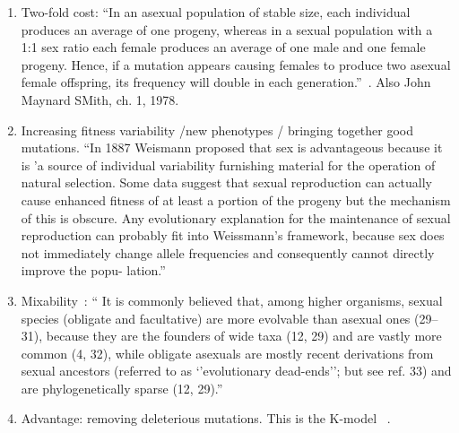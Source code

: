 \begin{enumerate}
    \item Two-fold cost: ``In an asexual population of stable size, each individual produces an average of one progeny, whereas in a  sexual population with a 1:1 sex ratio each female produces an average of one male and one female progeny. Hence, if a mutation appears causing females to produce two asexual female offspring, its frequency will double in each generation.''~\cite{kondrashov_deleterious_1988}. Also John Maynard SMith, ch. 1, 1978.

    \item Increasing fitness variability /new phenotypes / bringing together good mutations. ``In 1887 Weismann proposed that sex is advantageous because it is 'a source of individual variability furnishing material for  the operation of natural selection. Some data suggest that sexual reproduction can actually cause enhanced fitness of at least a portion of the progeny but the mechanism of this is obscure. Any evolutionary explanation for the maintenance of sexual reproduction can probably fit into Weissmann's framework, because sex does not immediately change allele frequencies and consequently cannot directly improve the popu- lation.''~\cite{kondrashov_deleterious_1988}
    
    \item Mixability~\cite{livnat_mixability_2008}: `` It is commonly believed that, among higher organisms, sexual species (obligate and facultative) are more evolvable than asexual ones (29–31), because they are the founders of wide taxa (12, 29) and are vastly more common (4, 32), while obligate asexuals are mostly recent derivations from sexual ancestors (referred to as ‘’evolutionary dead-ends’’; but see ref. 33) and are phylogenetically sparse (12, 29).”
    
    \item Advantage: removing deleterious mutations. This is the K-model ~\cite{kondrashov_deleterious_1988}.


\end{enumerate}


